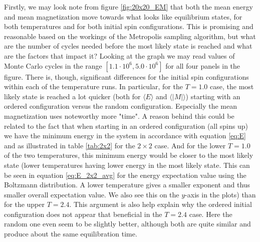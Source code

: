 \documentclass[12pt]{article}
\numberwithin{figure}{section}
\numberwithin{table}{section}
\begin{document}
\noindent Firstly, we may look note from figure \ref{fig:20x20_EM} that both the mean energy and mean magnetization move towards what looks like equilibrium states, for both temperatures and for both initial spin configurations. This is promising and reasonable based on the workings of the Metropolis sampling algorithm, but what are the number of cycles needed before the most likely state is reached and what are the factors that impact it? Looking at the graph we may read values of Monte Carlo cycles in the range $[1.1\cdot10^6, 5.0\cdot10^6]$ for all four panels in the figure. There is, though, significant differences for the initial spin configurations within each of the temperature runs. In particular, for the $T=1.0$ case, the most likely state is reached a lot quicker (both for $\langle E\rangle$ and $\langle |M| \rangle$) starting with an ordered configuration versus the random configuration. Especially the mean magnetization uses noteworthy more "time". A reason behind this could be related to the fact that when starting in an ordered configuration (all spins up) we have the minimum energy in the system in accordance with equation \eqref{eq:E} and as illustrated in table \ref{tab:2x2} for the $2\times2$ case. And for the lower $T=1.0$ of the two temperatures, this minimum energy would be closer to the most likely state (lower temperatures having lower energy in the most likely state. This can be seen in equation \eqref{eq:E_2x2_avg} for the energy expectation value using the Boltzmann distribution. A lower temperature gives a smaller exponent and thus smaller overall expectation value. We also see this on the $y$-axis in the plots) than for the upper $T=2.4$. This argument is also help explain why the ordered initial configuration does not appear that beneficial in the $T=2.4$ case. Here the random one even seem to be slightly better, although both are quite similar and produce about the same equilibration time.
\end{document}
